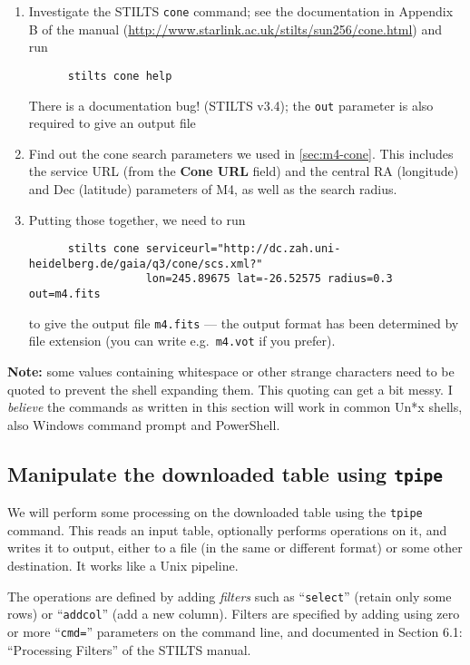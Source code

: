 \documentclass{article}
\newcommand{\lab}[1]{{\bf #1}}
\newcommand{\paragap}{\vspace{1.5ex}}
\begin{document}
\begin{enumerate}
\item Investigate the STILTS {\tt cone} command;
      see the documentation in Appendix B of the manual
      (\url{http://www.starlink.ac.uk/stilts/sun256/cone.html})
      and run
      \preverb
      \begin{verbatim}
      stilts cone help
      \end{verbatim}
      \postverb
      There is a documentation bug! (STILTS v3.4); the {\tt out} parameter
      is also required to give an output file
\item Find out the cone search parameters we used in \ref{sec:m4-cone}.
      This includes the service URL (from the \lab{Cone URL} field)
      and the central RA (longitude) and Dec (latitude) parameters of M4,
      as well as the search radius.
\item Putting those together, we need to run
      \preverb
      \begin{verbatim}
      stilts cone serviceurl="http://dc.zah.uni-heidelberg.de/gaia/q3/cone/scs.xml?" 
                  lon=245.89675 lat=-26.52575 radius=0.3 out=m4.fits
      \end{verbatim}
      \postverb
      to give the output file {\tt m4.fits} --- the output format has been
      determined by file extension
      (you can write e.g.\ {\tt m4.vot} if you prefer).
      \paragap
\end{enumerate}

{\bf Note:} some values containing whitespace or other strange
characters need to be quoted to prevent the shell expanding them.
This quoting can get a bit messy.
I {\em believe\/} the commands as written in this section will work
in common Un*x shells, also Windows command prompt and PowerShell.

\subsection{Manipulate the downloaded table using {\tt tpipe}}

We will perform some processing on the downloaded table using
the {\tt tpipe} command.
This reads an input table, optionally performs operations on it,
and writes it to output, either to a file (in the same or different format)
or some other destination.  It works like a Unix pipeline.
\paragap

The operations are defined by adding {\em filters} such as
``{\tt select}'' (retain only some rows) or ``{\tt addcol}''
(add a new column).  Filters are specified by adding using zero
or more ``{\tt cmd=}'' parameters on the command line,
and documented in Section 6.1: ``Processing Filters'' of the STILTS manual.
\paragap
\end{document}
